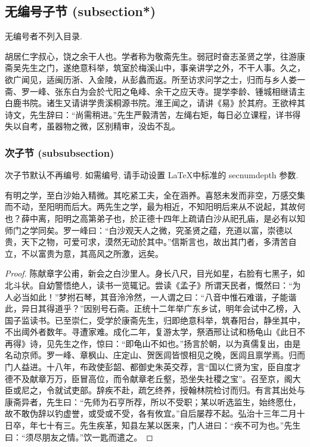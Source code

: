 	\subsection*{无编号子节 (subsection*)}
	无编号者不列入目录.
	\begin{proposition}[胡居仁]
		胡居仁字叔心，饶之余干人也。学者称为敬斋先生。弱冠时奋志圣贤之学，往游康斋吴先生之门，遂绝意科举，筑室於梅溪山中，事亲讲学之外，不干人事。久之，欲广闻见，适闽历浙、入金陵，从彭蠡而返。所至访求问学之士，归而与乡人娄一斋、罗一峰、张东白为会於弋阳之龟峰、余干之应天寺。提学李龄、锺城相继请主白鹿书院。诸生又请讲学贵溪桐源书院。淮王闻之，请讲《易》於其府。王欲梓其诗文，先生辞曰：“尚需稍进。”先生严毅清苦，左绳右矩，每日必立课程，详书得失以自考，虽器物之微，区别精审，没齿不乱。
	\end{proposition}

	\subsubsection{次子节 (subsubsection)}
	次子节默认不再编号. 如需编号, 请手动设置 \LaTeX 中标准的 \textsf{secnumdepth} 参数.

	\begin{lemma}[陈献章]\label{prop:chen}
		有明之学，至白沙始入精微。其吃紧工夫，全在涵养。喜怒未发而非空，万感交集而不动，至阳明而后大。两先生之学，最为相近，不知阳明后来从不说起，其故何也？薛中离，阳明之高第弟子也，於正德十四年上疏请白沙从祀孔庙，是必有以知师门之学同矣。罗一峰曰：“白沙观天人之微，究圣贤之蕴，充道以富，崇德以贵，天下之物，可爱可求，漠然无动於其中。”信斯言也，故出其门者，多清苦自立，不以富贵为意，其高风之所激，远矣。
	\end{lemma}
	\begin{proof}
		陈献章字公甫，新会之白沙里人。身长八尺，目光如星，右脸有七黑子，如北斗状。自幼警悟绝人，读书一览辄记。尝读《孟子》所谓天民者，慨然曰：“为人必当如此！”梦拊石琴，其音泠泠然，一人谓之曰：“八音中惟石难谐，子能谐此，异日其得道乎？”因别号石斋。正统十二年举广东乡试，明年会试中乙榜，入国子监读书。已至崇仁，受学於康斋先生，归即绝意科举，筑春阳台，静坐其中，不出阈外者数年。寻遭家难。成化二年，复游太学，祭酒邢让试和杨龟山《此日不再得》诗，见先生之作，惊曰：“即龟山不如也。”扬言於朝，以为真儒复出，由是名动京师。罗一峰、章枫山、庄定山、贺医闾皆恨相见之晚，医闾且禀学焉。归而门人益进。十八年，布政使彭韶、都御史朱英交荐，言“国以仁贤为宝，臣自度才德不及献章万万，臣冒高位，而令献章老丘壑，恐坐失社稷之宝”。召至京，阁大臣或尼之，令就试吏部。辞疾不赴，疏乞终养，授翰林院检讨而归。有言其出处与康斋异者，先生曰：“先师为石亨所荐，所以不受职；某以听选监生，始终愿仕，故不敢伪辞以钓虚誉，或受或不受，各有攸宜。”自后屡荐不起。弘治十三年二月十日卒，年七十有三。先生疾革，知县左某以医来，门人进曰：“疾不可为也。”先生曰：“须尽朋友之情。”饮一匙而遣之。
	\end{proof}

